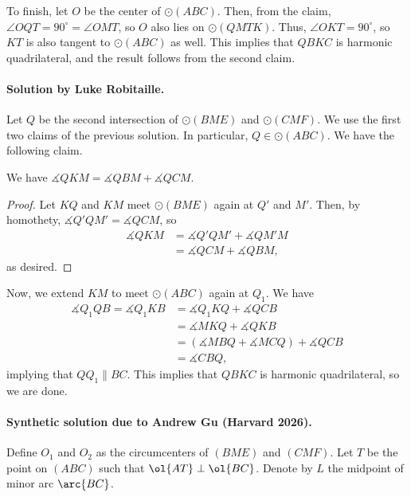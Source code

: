 \documentclass[11pt]{scrartcl}
\begin{document}
To finish, let $O$ be the center of $\odot(ABC)$. Then, from the claim, $\angle OQT = 90^\circ = \angle OMT$, so $O$ also lies on $\odot(QMTK)$.
Thus, $\angle OKT=90^\circ$, so $KT$ is also tangent to $\odot(ABC)$ as well. This implies that $QBKC$ is harmonic quadrilateral, and the result follows from the second claim.

\paragraph{Solution by Luke Robitaille.}
Let $Q$ be the second intersection of $\odot(BME)$ and
$\odot(CMF)$. We use the first two claims of the previous solution.
In particular, $Q\in\odot(ABC)$. We have the following claim.
\begin{claim*}
We have $\measuredangle QKM = \measuredangle QBM + \measuredangle QCM$.
\end{claim*}
\begin{proof}
    Let $KQ$ and $KM$ meet $\odot(BME)$ again at $Q'$ and $M'$. Then, by homothety, $\measuredangle Q'QM' = \measuredangle QCM$, so
    \begin{align*}
        \measuredangle QKM
	&= \measuredangle Q'QM' + \measuredangle QM'M \\
	&= \measuredangle QCM + \measuredangle QBM,
    \end{align*}
    as desired.
\end{proof}
Now, we extend $KM$ to meet $\odot(ABC)$ again at $Q_1$. We have
\begin{align*}
    \measuredangle Q_1QB
    = \measuredangle Q_1KB
    &= \measuredangle Q_1KQ + \measuredangle QCB \\
    &= \measuredangle MKQ + \measuredangle QKB \\
    &= (\measuredangle MBQ + \measuredangle MCQ)
	+ \measuredangle QCB \\
    &= \measuredangle CBQ,
\end{align*}
implying that $QQ_1\parallel BC$. This implies that $QBKC$ is harmonic quadrilateral, so we are done.

\paragraph{Synthetic solution due to Andrew Gu (Harvard 2026).}
Define $O_1$ and $O_2$ as the circumcenters of $(BME)$ and $(CMF)$.
Let $T$ be the point on $(ABC)$ such that $\ol{AT} \perp \ol{BC}$.
Denote by $L$ the midpoint of minor arc $\arc{BC}$.
\end{document}
